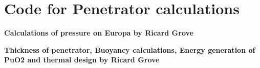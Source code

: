 \chapter{Code for Penetrator calculations}\label{app:ricard}

\textbf{Calculations of pressure on Europa by Ricard Grove}


\newpage
\textbf{Thickness of penetrator, Buoyancy calculations, Energy generation of PuO2 and thermal design by Ricard Grove}
